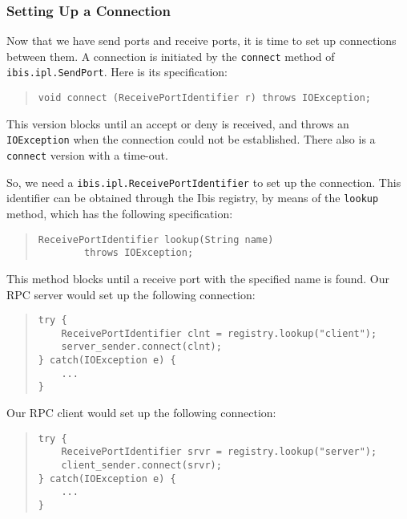 \documentclass[10pt]{article}
\begin{document}
\subsubsection{Setting Up a Connection}

Now that we have send ports and receive ports, it is time to set up
connections between them.
A connection is initiated by the \verb+connect+ method of
\verb+ibis.ipl.SendPort+.
Here is its specification:

\begin{quote}
\begin{verbatim}
void connect (ReceivePortIdentifier r) throws IOException;
\end{verbatim}
\end{quote}

This version blocks until an accept or deny is received, and throws
an \verb+IOException+ when the connection could not be established.
There also is a \verb+connect+ version with a time-out.

So, we need a \verb+ibis.ipl.ReceivePortIdentifier+ to set up the
connection.
This identifier can be obtained through the Ibis registry, by
means of the \verb+lookup+ method, which has the following specification:

\begin{quote}
\begin{verbatim}
ReceivePortIdentifier lookup(String name)
        throws IOException;
\end{verbatim}
\end{quote}

This method blocks until a receive port with the specified name is found.
Our RPC server would set up the following connection:

\begin{quote}
\begin{verbatim}
try {
    ReceivePortIdentifier clnt = registry.lookup("client");
    server_sender.connect(clnt);
} catch(IOException e) {
    ...
}
\end{verbatim}
\end{quote}

Our RPC client would set up the following connection:

\begin{quote}
\begin{verbatim}
try {
    ReceivePortIdentifier srvr = registry.lookup("server");
    client_sender.connect(srvr);
} catch(IOException e) {
    ...
}
\end{verbatim}
\end{quote}
\end{document}
